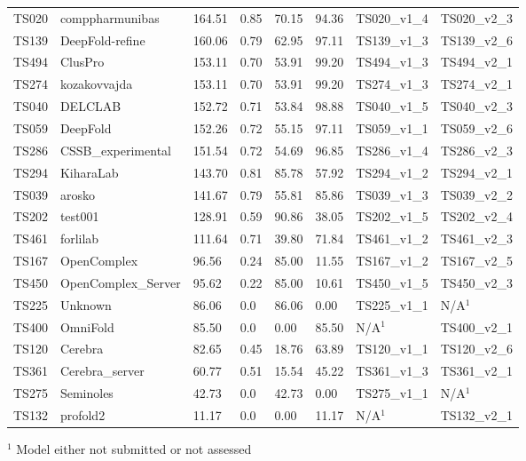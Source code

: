 \begin{table}[ht]
{\begin{tabular}{llllllll}
TS020 & comppharmunibas & 164.51 & 0.85 & 70.15 & 94.36 & TS020\_v1\_4 & TS020\_v2\_3 \\ 
TS139 & DeepFold-refine & 160.06 & 0.79 & 62.95 & 97.11 & TS139\_v1\_3 & TS139\_v2\_6 \\ 
TS494 & ClusPro & 153.11 & 0.70 & 53.91 & 99.20 & TS494\_v1\_3 & TS494\_v2\_1 \\ 
TS274 & kozakovvajda & 153.11 & 0.70 & 53.91 & 99.20 & TS274\_v1\_3 & TS274\_v2\_1 \\ 
TS040 & DELCLAB & 152.72 & 0.71 & 53.84 & 98.88 & TS040\_v1\_5 & TS040\_v2\_3 \\ 
TS059 & DeepFold & 152.26 & 0.72 & 55.15 & 97.11 & TS059\_v1\_1 & TS059\_v2\_6 \\ 
TS286 & CSSB\_experimental & 151.54 & 0.72 & 54.69 & 96.85 & TS286\_v1\_4 & TS286\_v2\_3 \\ 
TS294 & KiharaLab & 143.70 & 0.81 & 85.78 & 57.92 & TS294\_v1\_2 & TS294\_v2\_1 \\ 
TS039 & arosko & 141.67 & 0.79 & 55.81 & 85.86 & TS039\_v1\_3 & TS039\_v2\_2 \\ 
TS202 & test001 & 128.91 & 0.59 & 90.86 & 38.05 & TS202\_v1\_5 & TS202\_v2\_4 \\ 
TS461 & forlilab & 111.64 & 0.71 & 39.80 & 71.84 & TS461\_v1\_2 & TS461\_v2\_3 \\ 
TS167 & OpenComplex & 96.56 & 0.24 & 85.00 & 11.55 & TS167\_v1\_2 & TS167\_v2\_5 \\ 
TS450 & OpenComplex\_Server & 95.62 & 0.22 & 85.00 & 10.61 & TS450\_v1\_5 & TS450\_v2\_3 \\ 
TS225 & Unknown & 86.06 & 0.0 & 86.06 & 0.00 & TS225\_v1\_1 & N/A$^{1}$ \\ 
TS400 & OmniFold & 85.50 & 0.0 & 0.00 & 85.50 & N/A$^{1}$ & TS400\_v2\_1 \\ 
TS120 & Cerebra & 82.65 & 0.45 & 18.76 & 63.89 & TS120\_v1\_1 & TS120\_v2\_6 \\ 
TS361 & Cerebra\_server & 60.77 & 0.51 & 15.54 & 45.22 & TS361\_v1\_3 & TS361\_v2\_1 \\ 
TS275 & Seminoles & 42.73 & 0.0 & 42.73 & 0.00 & TS275\_v1\_1 & N/A$^{1}$ \\ 
TS132 & profold2 & 11.17 & 0.0 & 0.00 & 11.17 & N/A$^{1}$ & TS132\_v2\_1 \\ 
\bottomrule
\end{tabular}%
}
\begin{flushleft}\footnotesize $^{1}$ Model either not submitted or not assessed\end{flushleft}
\end{table}
